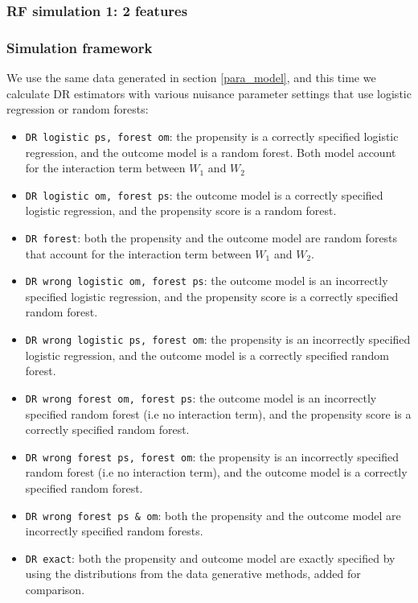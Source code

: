 \documentclass[12pt,twoside]{article}
\begin{document}
\subsubsection{RF simulation 1: 2 features}

\subsubsection*{Simulation framework}

We use the same data generated in section \ref{para_model}, and this time we calculate DR estimators with various nuisance parameter settings that use logistic regression or random forests:
\begin{itemize}
    \item \texttt{DR logistic ps, forest om}: the propensity is a correctly specified logistic regression, and the outcome model is a random forest. Both model account for the interaction term between $W_1$ and $W_2$
    \item \texttt{DR logistic om, forest ps}: the outcome model is a correctly specified logistic regression, and the propensity score is a random forest.
    \item \texttt{DR forest}: both the propensity and the outcome model are random forests that account for the interaction term between $W_1$ and $W_2$.
    \item \texttt{DR wrong logistic om, forest ps}: the outcome model is an incorrectly specified logistic regression, and the propensity score is a correctly specified random forest.
    \item \texttt{DR wrong logistic ps, forest om}: the propensity is an incorrectly specified logistic regression, and the outcome model is a correctly specified random forest.
    \item \texttt{DR wrong forest om, forest ps}: the outcome model is an incorrectly specified random forest (i.e no interaction term), and the propensity score is a correctly specified random forest.
    \item \texttt{DR wrong forest ps, forest om}: the propensity is an incorrectly specified random forest (i.e no interaction term), and the outcome model is a correctly specified random forest.
    \item \texttt{DR wrong forest ps \& om}: both the propensity and the outcome model are incorrectly specified random forests.
    \item \texttt{DR exact}: both the propensity and outcome model are exactly specified by using the distributions from the data generative methods, added for comparison.
\end{itemize}
\end{document}

